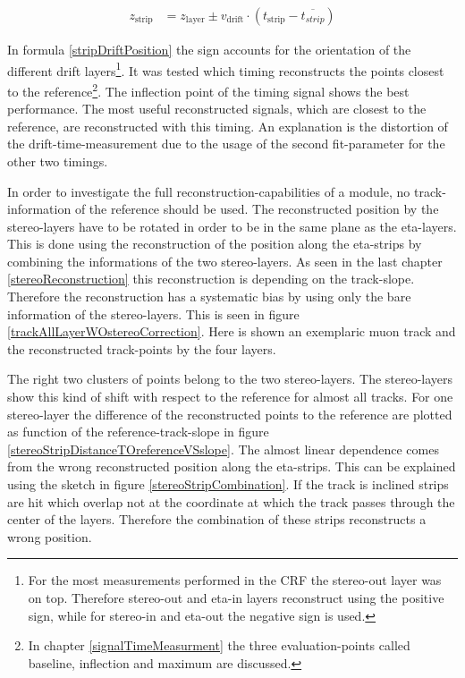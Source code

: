 \documentclass[
twoside,            %
BCOR1.4cm,          %
10pt,               %
headings=normal,    %
headsepline,        %
clearplainpage,		%
final,              %
div=14,
open=right,
bibliography=toc
]{scrreprt}
\begin{document}
\begin{align}
	z_{\mathrm{strip}} &= z_{\mathrm{layer}} \pm v_{\mathrm{drift}} \cdot ( t_{\mathrm{strip}} - \overline{t_{strip}} )
	\label{stripDriftPosition}
\end{align}

In formula \ref{stripDriftPosition} the sign accounts for the orientation of the different drift layers\footnote{
	For the most measurements performed in the CRF the stereo-out layer was on top.
	Therefore stereo-out and eta-in layers reconstruct using the positive sign, while for stereo-in and eta-out the negative sign is used.
}.
It was tested which timing reconstructs the points closest to the reference\footnote{
	In chapter \ref{signalTimeMeasurment} the three evaluation-points called baseline, inflection and maximum are discussed.
}.
The inflection point of the timing signal shows the best performance.
The most useful reconstructed signals, which are closest to the reference, are reconstructed with this timing.
An explanation is the distortion of the drift-time-measurement due to the usage of the second fit-parameter for the other two timings.

In order to investigate the full reconstruction-capabilities of a module, no track-information of the reference should be used.
The reconstructed position by the stereo-layers have to be rotated in order to be in the same plane as the eta-layers.
This is done using the reconstruction of the position along the eta-strips by combining the informations of the two stereo-layers.
As seen in the last chapter \ref{stereoReconstruction} this reconstruction is depending on the track-slope.
Therefore the reconstruction has a systematic bias by using only the bare information of the stereo-layers.
This is seen in figure \ref{trackAllLayerWOstereoCorrection}.
Here is shown an exemplaric muon track and the reconstructed track-points by the four layers.

The right two clusters of points belong to the two stereo-layers.
The stereo-layers show this kind of shift with respect to the reference for almost all tracks.
For one stereo-layer the difference of the reconstructed points to the reference are plotted as function of the reference-track-slope in figure \ref{stereoStripDistanceTOreferenceVSslope}.
The almost linear dependence comes from the wrong reconstructed position along the eta-strips.
This can be explained using the sketch in figure \ref{stereoStripCombination}.
If the track is inclined strips are hit which overlap not at the coordinate at which the track passes through the center of the layers.
Therefore the combination of these strips reconstructs a wrong position.
\end{document}
